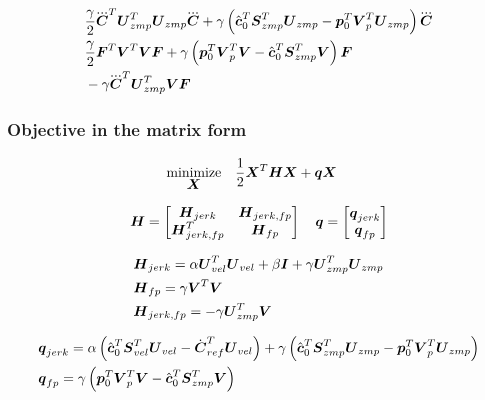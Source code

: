\begin{equation*}
\begin{split}
    &
    \frac{\gamma}{2} \cJerk^T \M{U}_{zmp}^T \M{U}_{zmp} \cJerk
    + 
    \gamma 
    \left(
        \cstate_0^T \M{S}_{zmp}^T \M{U}_{zmp}
        - 
        \fp_0^T \M{V}_p^T \M{U}_{zmp} 
    \right)
    \cJerk\\
    &
    \frac{\gamma}{2} \FD^T \M{V}^T \M{V} \FD
    + 
    \gamma 
    \left(
        \fp_0^T \M{V}_p^T \M{V}
        - 
        \cstate_0^T \M{S}_{zmp}^T \M{V}
    \right)
    \FD\\
    &
    - \gamma \cJerk^T \M{U}_{zmp}^T \M{V} \FD
\end{split}
\end{equation*}

\subsubsection{Objective in the matrix form}
\begin{equation*}
\begin{split}
    \underset{\mbox{\boldmath $X$}}{\operatorname{minimize}}\quad    & \frac{1}{2} \mbox{\boldmath $X$}^T\mbox{\boldmath $H$}\mbox{\boldmath $X$} + \mbox{\boldmath $q$} \mbox{\boldmath $X$}
\end{split}
\end{equation*}

\begin{equation*}
\mbox{\boldmath $H$} = 
    \begin{bmatrix}
        \mbox{\boldmath $H$}_{jerk}        &   \mbox{\boldmath $H$}_{jerk,fp}\\
        \mbox{\boldmath $H$}_{jerk,fp}^T   &   \mbox{\boldmath $H$}_{fp}
    \end{bmatrix}
\quad
\mbox{\boldmath $q$} = 
    \begin{bmatrix}
        \mbox{\boldmath $q$}_{jerk}\\
        \mbox{\boldmath $q$}_{fp}
    \end{bmatrix}
\end{equation*}

\begin{equation*}
\begin{split}
& \mbox{\boldmath $H$}_{jerk} = 
    \alpha \mbox{\boldmath $U$}_{vel}^T \mbox{\boldmath $U$}_{vel} 
    + \beta \mbox{\boldmath $I$}
    + \gamma \mbox{\boldmath $U$}_{zmp}^T \mbox{\boldmath $U$}_{zmp}\\
& \mbox{\boldmath $H$}_{fp} = 
    \gamma \mbox{\boldmath $V$}^T \mbox{\boldmath $V$}\\
& \mbox{\boldmath $H$}_{jerk,fp} = 
    - \gamma \mbox{\boldmath $U$}_{zmp}^T \mbox{\boldmath $V$}
\end{split}
\end{equation*}


\begin{equation*}
\begin{split}
& \mbox{\boldmath $q$}_{jerk} = 
    \alpha 
    \left(
        \hat{\mbox{\boldmath $c$}}_0^T \mbox{\boldmath $S$}_{vel}^T \mbox{\boldmath $U$}_{vel}
        -
        \dot{\mbox{\boldmath $C$}}_{ref}^T \mbox{\boldmath $U$}_{vel} 
    \right)
    + 
    \gamma 
    \left(
        \hat{\mbox{\boldmath $c$}}_0^T \mbox{\boldmath $S$}_{zmp}^T \mbox{\boldmath $U$}_{zmp}
        - 
        \mbox{\boldmath $p$}_0^T \mbox{\boldmath $V$}_p^T \mbox{\boldmath $U$}_{zmp} 
    \right)\\
& \mbox{\boldmath $q$}_{fp} =
    \gamma 
    \left(
        \mbox{\boldmath $p$}_0^T \mbox{\boldmath $V$}_p^T \mbox{\boldmath $V$}
        - 
        \hat{\mbox{\boldmath $c$}}_0^T \mbox{\boldmath $S$}_{zmp}^T \mbox{\boldmath $V$}
    \right)
\end{split}
\end{equation*}


